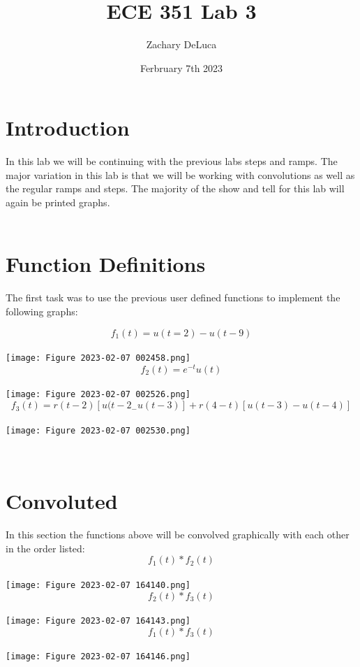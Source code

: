 \documentclass[12pt,a4paper]{article}
\title{ECE 351 Lab 3}
\author{Zachary DeLuca  }
\date{Ferbruary 7th 2023}
\begin{document}
\maketitle
\hline
\section{Introduction}
In this lab we will be continuing with the previous labs steps and ramps. The major variation in this lab is that we will be working with convolutions as well as the regular ramps and steps. The majority of the show and tell for this lab will again be printed graphs. 
\vspace{0.25in} \\
\hline \\
\section{Function Definitions }
The first task was to use the previous user defined functions to implement the following graphs: 
\begin{center}
$$f_1(t)=u(t=2)-u(t-9)$$\\
\texttt{[image: Figure 2023-02-07 002458.png]} 
$$f_2(t)=e^{-t}u(t)$$\\
\texttt{[image: Figure 2023-02-07 002526.png]}
$$f_3(t)=r(t-2)[u(t-2_-u(t-3)]+r(4-t)[u(t-3)-u(t-4)]$$\\
\texttt{[image: Figure 2023-02-07 002530.png]}
\end{center}
\hline \\
\section{Convoluted}
In this section the functions above will be convolved graphically with each other in the order listed: 
$$f_1(t)*f_2(t)$$ \\
\texttt{[image: Figure 2023-02-07 164140.png]} \\
$$f_2(t)*f_3(t)$$ \\
\texttt{[image: Figure 2023-02-07 164143.png]} \\
$$f_1(t)*f_3(t)$$ \\
\texttt{[image: Figure 2023-02-07 164146.png]} \\
\hline \\
\end{document}
